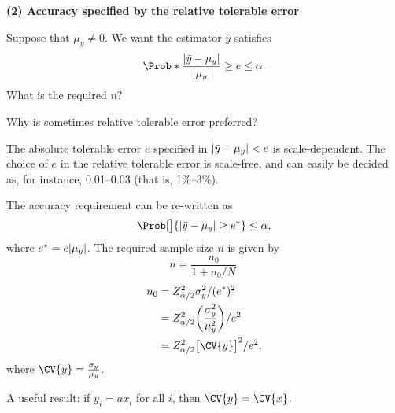 \textbf{(2) Accuracy specified by the relative tolerable error}

Suppose that $ \mu_y\ne 0 $. We want the estimator $ \bar{y} $ satisfies
\[ \Prob*{\frac{\abs{\bar{y}-\mu_y}}{\abs{\mu_y}}\ge e}\le \alpha. \]
What is the required $ n $?

Why is sometimes relative tolerable error preferred?

The absolute tolerable error $ e $ specified in $ \lvert\bar{y}-\mu_y\rvert<e $ is scale-dependent.
The choice of $ e $ in the relative tolerable error is scale-free, and can easily be decided as, for instance,
0.01--0.03 (that is, 1\%--3\%).

The accuracy requirement can be re-written as
\[ \Prob[\big]{\abs{\bar{y}-\mu_y}\ge e^*}\le \alpha, \]
where $ e^*=e\lvert\mu_y\rvert $. The required sample size $ n $ is given by
\[ n=\frac{n_0}{1+n_0/N}. \]
\begin{align*}
      n_0
       & =Z_{\alpha/2}^2\sigma_y^2/(e^*)^2                           \\
       & =Z_{\alpha/2}^2\biggl(\frac{\sigma_y^2}{\mu_y^2}\biggr)/e^2 \\
       & =Z_{\alpha/2}^2\bigl[\CV{y}\bigr]^2/e^2,
\end{align*}
where $ \CV{y}=\frac{\sigma_y}{\mu_y} $.

A useful result: if $ y_i=a x_i $ for all $ i $, then $ \CV{y}=\CV{x} $.


